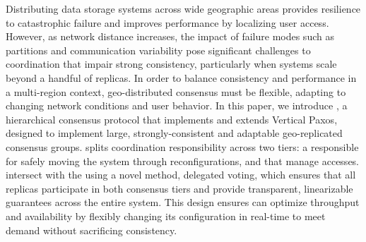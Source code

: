 Distributing data storage systems across wide geographic areas provides resilience to
catastrophic failure and improves performance by localizing user access.
However, as network distance increases, the impact of failure modes such as partitions
and communication variability pose significant challenges to coordination that impair
strong consistency, particularly when systems scale beyond a handful of replicas.
In order to balance consistency and performance in a multi-region context, geo-distributed
consensus must be flexible, adapting to changing network conditions and user behavior.
In this paper, we introduce \sys, a hierarchical consensus protocol that implements and
extends Vertical Paxos, designed to implement large, strongly-consistent and adaptable
geo-replicated consensus groups.
\sys splits coordination responsibility across two tiers: a \roo responsible for
safely moving the system through reconfigurations, and \subs that manage accesses.
\Subs intersect with the \roo using a novel method, delegated voting, which ensures that
all replicas participate in both consensus tiers and provide transparent, linearizable
guarantees across the entire system.
This design ensures \sys can optimize throughput and availability by flexibly changing
its configuration in real-time to meet demand without sacrificing consistency.
